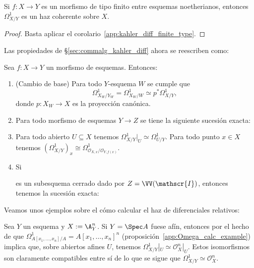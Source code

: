 \begin{cor}
	Si $f \colon X \to Y$ es un morfismo de tipo finito entre esquemas noetherianos,
	entonces $\Omega_{X/Y}^1$ es un haz coherente sobre $X$.
\end{cor}
\begin{proof}
	Basta aplicar el corolario~\ref{app:kahler_diff_finite_type}.
\end{proof}

Las propiedades de \S\ref{sec:commalg_kahler_diff} ahora se reescriben como:
\begin{thm}\label{thm:rel_diff_props}
	Sea $f \colon X \to Y$ un morfismo de esquemas. Entonces:
	\begin{enumerate}
		\item (Cambio de base) Para todo $Y$-esquema $W$ se cumple que
			$$ \Omega_{X_W/Y_W}^1 = \Omega_{X_W/W}^1 \simeq p^*\Omega_{X/Y}^1, $$
			donde $p \colon X_W \to X$ es la proyección canónica.
		\item\label{thm:rel_diff_props_exact}
			Para todo morfismo de esquemas $Y \to Z$ se tiene la siguiente sucesión exacta:
			\begin{center}
			\end{center}
		\item Para todo abierto $U \subseteq X$ tenemos $\Omega_{X/Y}^1|_U \simeq \Omega_{U/Y}^1$.
			Para todo punto $x \in X$ tenemos $(\Omega_{X/Y}^1)_x \cong \Omega_{\mathscr{O}_{X, x}/\mathscr{O}_{Y, f(x)}}^1$.
		\item Si 
			es un subesquema cerrado dado por $Z = \VV(\mathscr{I})$, entonces tenemos la sucesión exacta:
			\begin{center}
			\end{center}
	\end{enumerate}
\end{thm}

Veamos unos ejemplos sobre el cómo calcular el haz de diferenciales relativos:
\begin{exn}\label{ex:affine_space_diff}
	Sea $Y$ un esquema y $X := \A_Y^n$.
	Si $Y = \Spec A$ fuese afín, entonces por el hecho de que $\Omega_{A[x_1, \dots, x_n]/A}^1 = A[x_1, \dots, x_n]^n$
	(proposición~\ref{app:Omega_calc_example}) implica que, sobre abiertos afines $U$, tenemos $\Omega_{X/Y}^1|_U \simeq \mathscr{O}_X^n|_U$.
	Estos isomorfismos son claramente compatibles entre sí de lo que se sigue que $\Omega_{X/Y}^1 \simeq \mathscr{O}_X^n$.
\end{exn}

